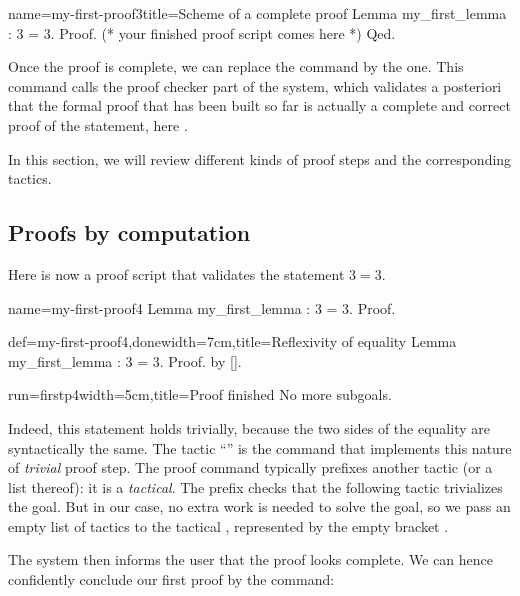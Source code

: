 \begin{coq}{name=my-first-proof3}{title=Scheme of a complete proof}
Lemma my_first_lemma : 3 = 3.
Proof.
(* your finished proof script comes here *)
Qed.
\end{coq}

Once the proof is complete, we can replace the  command by
the  one. This command calls the proof checker part of  the \Coq{}
system, which validates a posteriori that the formal proof that has
been built so far is actually a complete and correct proof of the
statement, here .

In this section, we will review different kinds of proof steps and
the corresponding tactics.

\subsection{Proofs by computation}\label{ssec:proofcomp}

Here is now a proof script that validates the statement $3 = 3$.

\begin{coqdef}{name=my-first-proof4}
Lemma my_first_lemma : 3 = 3.
Proof.
\end{coqdef}
\begin{coq}{def=my-first-proof4,done}{width=7cm,title=Reflexivity of equality}
Lemma my_first_lemma : 3 = 3.
Proof. by [].
\end{coq}
\begin{coqout}{run=firstp4}{width=5cm,title=Proof finished}
No more subgoals.
$~$
\end{coqout}

Indeed, this statement holds trivially, because the two sides of
the equality are syntactically the same. The tactic ``'' is
the command that
implements this nature of \emph{trivial} proof step. The proof command
 typically prefixes another tactic (or a list thereof): it is
a \emph{tactical}. The  prefix checks that the following tactic
trivializes the goal. But in our case, no extra work is needed to
solve the goal, so we pass an empty list of tactics to the tactical
, represented by the empty bracket \C{[]}.


The system then informs the user that the proof looks complete. We can hence
confidently conclude our first proof by the  command:

